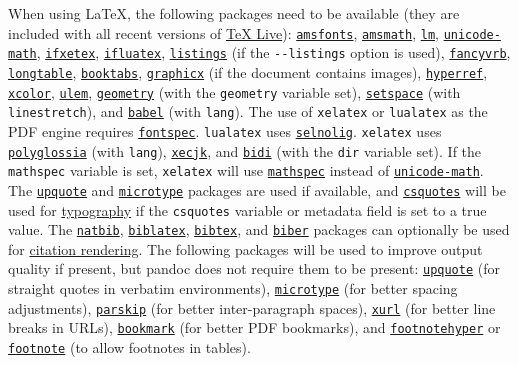 \documentclass[]{article}
\begin{document}
When using LaTeX, the following packages need to be available (they are
included with all recent versions of
\href{https://www.tug.org/texlive/}{TeX Live}):
\href{https://ctan.org/pkg/amsfonts}{\texttt{amsfonts}},
\href{https://ctan.org/pkg/amsmath}{\texttt{amsmath}},
\href{https://ctan.org/pkg/lm}{\texttt{lm}},
\href{https://ctan.org/pkg/unicode-math}{\texttt{unicode-math}},
\href{https://ctan.org/pkg/ifxetex}{\texttt{ifxetex}},
\href{https://ctan.org/pkg/ifluatex}{\texttt{ifluatex}},
\href{https://ctan.org/pkg/listings}{\texttt{listings}} (if the
\texttt{-\/-listings} option is used),
\href{https://ctan.org/pkg/fancyvrb}{\texttt{fancyvrb}},
\href{https://ctan.org/pkg/longtable}{\texttt{longtable}},
\href{https://ctan.org/pkg/booktabs}{\texttt{booktabs}},
\href{https://ctan.org/pkg/graphicx}{\texttt{graphicx}} (if the document
contains images),
\href{https://ctan.org/pkg/hyperref}{\texttt{hyperref}},
\href{https://ctan.org/pkg/xcolor}{\texttt{xcolor}},
\href{https://ctan.org/pkg/ulem}{\texttt{ulem}},
\href{https://ctan.org/pkg/geometry}{\texttt{geometry}} (with the
\texttt{geometry} variable set),
\href{https://ctan.org/pkg/setspace}{\texttt{setspace}} (with
\texttt{linestretch}), and
\href{https://ctan.org/pkg/babel}{\texttt{babel}} (with \texttt{lang}).
The use of \texttt{xelatex} or \texttt{lualatex} as the PDF engine
requires \href{https://ctan.org/pkg/fontspec}{\texttt{fontspec}}.
\texttt{lualatex} uses
\href{https://ctan.org/pkg/selnolig}{\texttt{selnolig}}.
\texttt{xelatex} uses
\href{https://ctan.org/pkg/polyglossia}{\texttt{polyglossia}} (with
\texttt{lang}), \href{https://ctan.org/pkg/xecjk}{\texttt{xecjk}}, and
\href{https://ctan.org/pkg/bidi}{\texttt{bidi}} (with the \texttt{dir}
variable set). If the \texttt{mathspec} variable is set,
\texttt{xelatex} will use
\href{https://ctan.org/pkg/mathspec}{\texttt{mathspec}} instead of
\href{https://ctan.org/pkg/unicode-math}{\texttt{unicode-math}}. The
\href{https://ctan.org/pkg/upquote}{\texttt{upquote}} and
\href{https://ctan.org/pkg/microtype}{\texttt{microtype}} packages are
used if available, and
\href{https://ctan.org/pkg/csquotes}{\texttt{csquotes}} will be used for
\protect\hyperlink{typography}{typography} if the \texttt{csquotes}
variable or metadata field is set to a true value. The
\href{https://ctan.org/pkg/natbib}{\texttt{natbib}},
\href{https://ctan.org/pkg/biblatex}{\texttt{biblatex}},
\href{https://ctan.org/pkg/bibtex}{\texttt{bibtex}}, and
\href{https://ctan.org/pkg/biber}{\texttt{biber}} packages can
optionally be used for \protect\hyperlink{citation-rendering}{citation
rendering}. The following packages will be used to improve output
quality if present, but pandoc does not require them to be present:
\href{https://ctan.org/pkg/upquote}{\texttt{upquote}} (for straight
quotes in verbatim environments),
\href{https://ctan.org/pkg/microtype}{\texttt{microtype}} (for better
spacing adjustments),
\href{https://ctan.org/pkg/parskip}{\texttt{parskip}} (for better
inter-paragraph spaces), \href{https://ctan.org/pkg/xurl}{\texttt{xurl}}
(for better line breaks in URLs),
\href{https://ctan.org/pkg/bookmark}{\texttt{bookmark}} (for better PDF
bookmarks), and
\href{https://ctan.org/pkg/footnotehyper}{\texttt{footnotehyper}} or
\href{https://ctan.org/pkg/footnote}{\texttt{footnote}} (to allow
footnotes in tables).
\end{document}
